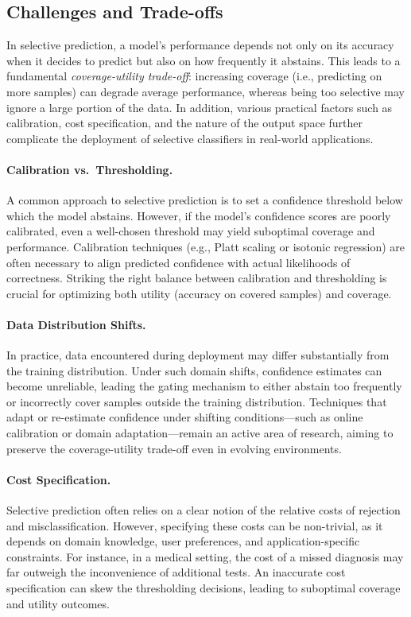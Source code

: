 \subsection{Challenges and Trade-offs}
In selective prediction, a model’s performance depends not only on its accuracy when it decides to predict but also on how frequently it abstains. This leads to a fundamental \emph{coverage-utility trade-off}: increasing coverage (i.e., predicting on more samples) can degrade average performance, whereas being too selective may ignore a large portion of the data. In addition, various practical factors such as calibration, cost specification, and the nature of the output space further complicate the deployment of selective classifiers in real-world applications.

\paragraph{Calibration vs.\ Thresholding.}
A common approach to selective prediction is to set a confidence threshold below which the model abstains. However, if the model’s confidence scores are poorly calibrated, even a well-chosen threshold may yield suboptimal coverage and performance. Calibration techniques (e.g., Platt scaling or isotonic regression) are often necessary to align predicted confidence with actual likelihoods of correctness. Striking the right balance between calibration and thresholding is crucial for optimizing both utility (accuracy on covered samples) and coverage.

\paragraph{Data Distribution Shifts.}
In practice, data encountered during deployment may differ substantially from the training distribution. Under such domain shifts, confidence estimates can become unreliable, leading the gating mechanism to either abstain too frequently or incorrectly cover samples outside the training distribution. Techniques that adapt or re-estimate confidence under shifting conditions—such as online calibration or domain adaptation—remain an active area of research, aiming to preserve the coverage-utility trade-off even in evolving environments.

\paragraph{Cost Specification.}
Selective prediction often relies on a clear notion of the relative costs of rejection and misclassification. However, specifying these costs can be non-trivial, as it depends on domain knowledge, user preferences, and application-specific constraints. For instance, in a medical setting, the cost of a missed diagnosis may far outweigh the inconvenience of additional tests. An inaccurate cost specification can skew the thresholding decisions, leading to suboptimal coverage and utility outcomes.

